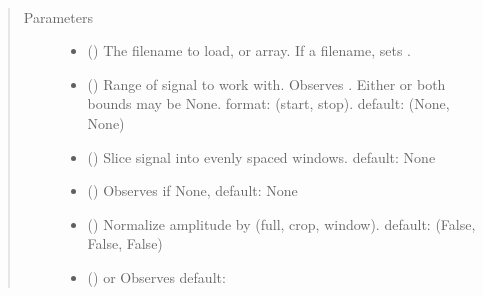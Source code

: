 \documentclass[letterpaper,10pt,openany,oneside,english]{sphinxmanual}
\begin{document}
\begin{fulllineitems}
\label{\detokenize{signals:signals.BaseTrajectory}}~\begin{quote}\begin{description}
\item[{Parameters}] \leavevmode\begin{itemize}
\item {} 
 () \textendash{} The filename to load, or array. If a filename, sets .

\item {} 
 (\sphinxstyleliteralemphasis{, }) \textendash{} Range of signal to work with. Observes . Either or both
bounds may be None.
format: (start, stop).
default: (None, None)

\item {} 
 (\sphinxstyleliteralemphasis{, }) \textendash{} Slice signal into  evenly spaced windows.
default: None

\item {} 
 (\sphinxstyleliteralemphasis{, }) \textendash{} Observes 
if None, 
default: None

\item {} 
 (\sphinxstyleliteralemphasis{, }) \textendash{} Normalize amplitude by (full, crop, window).
default: (False, False, False)

\item {} 
 (\sphinxstyleliteralemphasis{, }) \textendash{}  or 
Observes 
default: 


\end{itemize}
\end{description}
\end{quote}
\end{fulllineitems}
\end{document}

